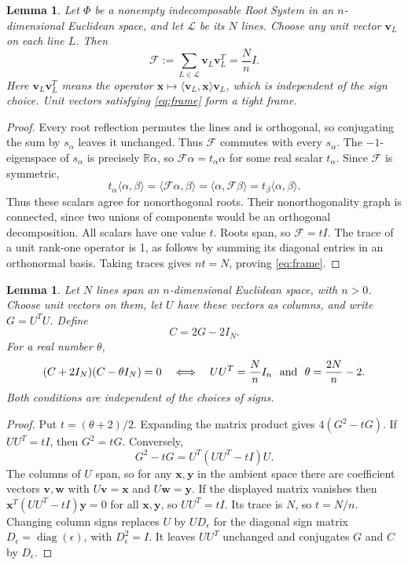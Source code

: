 \documentclass[11pt]{amsart}
\newcommand\cF{{\mathcal F}}
\newcommand\cL{{\mathcal L}}
\newcommand\re{{\mathbb R}}%
\newcommand\Zv{{\mathbf v}}
\newcommand\Zw{{\mathbf w}}
\newcommand\Zy{{\mathbf y}}
\newcommand\Zx{{\mathbf x}}
\newcommand\opk[1]{\mathop{\mathrm{#1}}\nolimits}
\newcommand\ip[2]{\langle#1,#2\rangle}
\newtheorem{lemma}[theorem]{Lemma}
\theoremstyle{definition}
\begin{document}
\begin{lemma}\label{lem:tight-frame}
Let $\Phi$ be a nonempty indecomposable Root System in an
$n$-dimensional Euclidean space, and let $\cL$ be its $N$ lines.
Choose any unit vector $\Zv_L$ on each line $L$. Then
\begin{equation}\label{eq:frame}
 \cF:=\sum_{L\in\cL}\Zv_L\Zv_L^T=\frac{N}{n}I.
\end{equation}
Here $\Zv_L\Zv_L^T$ means the operator
$\Zx\mapsto\ip{\Zv_L}{\Zx}\Zv_L$, which is independent of the sign choice.
Unit vectors satisfying \eqref{eq:frame} form a \emph{tight frame}.
\end{lemma}
\begin{proof}
Every root reflection permutes the lines and is orthogonal, so conjugating
the sum by $s_\alpha$ leaves it unchanged. Thus $\cF$ commutes with every
$s_\alpha$. The $-1$-eigenspace of $s_\alpha$ is precisely $\re\alpha$,
so $\cF\alpha=t_\alpha\alpha$ for some real scalar $t_\alpha$.
Since $\cF$ is symmetric,
\[
 t_\alpha\ip{\alpha}{\beta}
   =\ip{\cF\alpha}{\beta}=\ip{\alpha}{\cF\beta}
   =t_\beta\ip{\alpha}{\beta}.
\]
Thus these scalars agree for nonorthogonal roots. Their nonorthogonality
graph is connected, since two unions of components would be an orthogonal
decomposition. All scalars have one value $t$. Roots span, so $\cF=tI$.
The trace of a unit rank-one operator is 1, as follows by summing its
diagonal entries in an orthonormal basis. Taking traces gives $nt=N$,
proving \eqref{eq:frame}.
\end{proof}

\begin{lemma}\label{lem:C-convention}
Let $N$ lines span an $n$-dimensional Euclidean space, with $n>0$.
Choose unit vectors on them, let $U$ have these vectors as columns, and
write $G=U^TU$. Define
\begin{equation}\label{eq:C-convention}
 C=2G-2I_N.
\end{equation}
For a real number $\theta$,
\[
 (C+2I_N)(C-\theta I_N)=0
 \quad\Longleftrightarrow\quad
 UU^T=\frac{N}{n}I_n\ \hbox{ and }\ \theta=\frac{2N}{n}-2.
\]
Both conditions are independent of the choices of signs.
\end{lemma}
\begin{proof}
Put $t=(\theta+2)/2$. Expanding the matrix product gives
$4(G^2-tG)$. If $UU^T=tI$, then $G^2=tG$. Conversely,
\[
 G^2-tG=U^T(UU^T-tI)U.
\]
The columns of $U$ span, so for any $\Zx,\Zy$ in the ambient space there
are coefficient vectors $\Zv,\Zw$ with $U\Zv=\Zx$ and $U\Zw=\Zy$.
If the displayed matrix vanishes then
$\Zx^T(UU^T-tI)\Zy=0$ for all $\Zx,\Zy$, so $UU^T=tI$.
Its trace is $N$, so $t=N/n$. Changing column signs replaces $U$ by
$UD_\epsilon$ for the diagonal sign matrix $D_\epsilon=\opk{diag}(\epsilon)$, with $D_\epsilon^2=I$.
It leaves $UU^T$ unchanged and conjugates $G$ and $C$ by $D_\epsilon$.
\end{proof}
\end{document}
